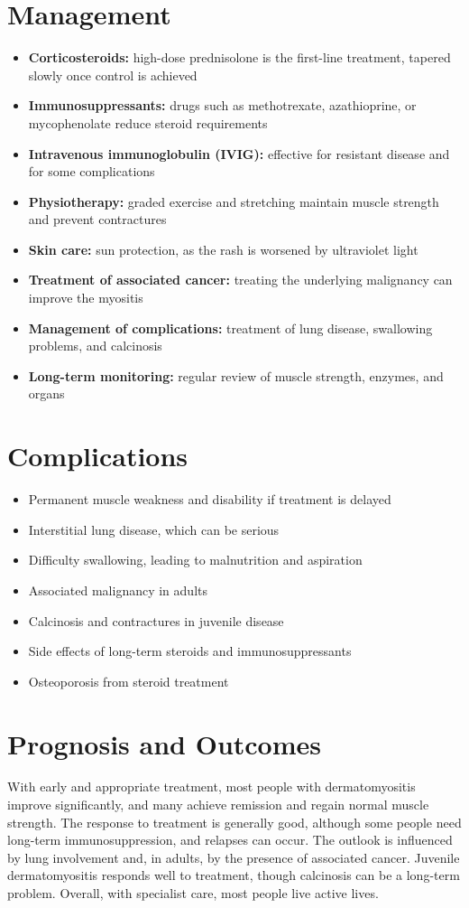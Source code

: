\section*{Management}
\begin{itemize}
    \item \textbf{Corticosteroids:} high-dose prednisolone is the first-line treatment, tapered slowly once control is achieved
    \item \textbf{Immunosuppressants:} drugs such as methotrexate, azathioprine, or mycophenolate reduce steroid requirements
    \item \textbf{Intravenous immunoglobulin (IVIG):} effective for resistant disease and for some complications
    \item \textbf{Physiotherapy:} graded exercise and stretching maintain muscle strength and prevent contractures
    \item \textbf{Skin care:} sun protection, as the rash is worsened by ultraviolet light
    \item \textbf{Treatment of associated cancer:} treating the underlying malignancy can improve the myositis
    \item \textbf{Management of complications:} treatment of lung disease, swallowing problems, and calcinosis
    \item \textbf{Long-term monitoring:} regular review of muscle strength, enzymes, and organs
\end{itemize}

\section*{Complications}
\begin{itemize}
    \item Permanent muscle weakness and disability if treatment is delayed
    \item Interstitial lung disease, which can be serious
    \item Difficulty swallowing, leading to malnutrition and aspiration
    \item Associated malignancy in adults
    \item Calcinosis and contractures in juvenile disease
    \item Side effects of long-term steroids and immunosuppressants
    \item Osteoporosis from steroid treatment
\end{itemize}

\section*{Prognosis and Outcomes}
With early and appropriate treatment, most people with dermatomyositis improve significantly, and many achieve remission and regain normal muscle strength. The response to treatment is generally good, although some people need long-term immunosuppression, and relapses can occur. The outlook is influenced by lung involvement and, in adults, by the presence of associated cancer. Juvenile dermatomyositis responds well to treatment, though calcinosis can be a long-term problem. Overall, with specialist care, most people live active lives.

